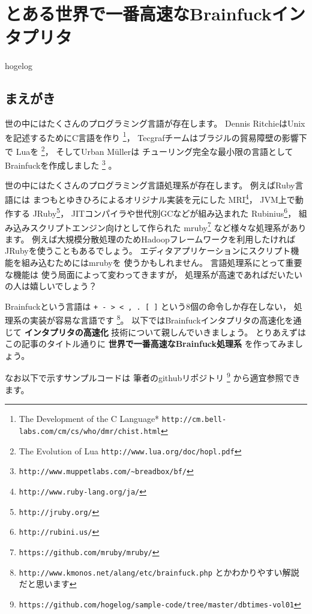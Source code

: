 

\chapter{とある世界で一番高速なBrainfuckインタプリタ}
\begin{flushright}
hogelog
\end{flushright}

\section{まえがき}
\lettrine{世}
の中にはたくさんのプログラミング言語が存在します。
Dennis RitchieはUnixを記述するためにC言語を作り
\footnote{The Development of the C Language* 
\verb|http://cm.bell-labs.com/cm/cs/who/dmr/chist.html|
}，
Tecgrafチームはブラジルの貿易障壁の影響下で
Luaを
\footnote{
The Evolution of Lua
\verb|http://www.lua.org/doc/hopl.pdf|
}，
そしてUrban M\"ullerは
チューリング完全な最小限の言語として
Brainfuckを作成しました
\footnote{
\verb|http://www.muppetlabs.com/~breadbox/bf/|
}
。

世の中にはたくさんのプログラミング言語処理系が存在します。
例えばRuby言語には
まつもとゆきひろによるオリジナル実装を元にした
MRI\footnote{
\verb|http://www.ruby-lang.org/ja/|
}，
JVM上で動作する
JRuby\footnote{
\verb|http://jruby.org/|
}，
JITコンパイラや世代別GCなどが組み込まれた
Rubinius\footnote{
\verb|http://rubini.us/|
}，
組み込みスクリプトエンジン向けとして作られた
mruby\footnote{
\verb|https://github.com/mruby/mruby/|
}
など様々な処理系があります。
例えば大規模分散処理のためHadoopフレームワークを利用したければ
JRubyを使うこともあるでしょう。
エディタアプリケーションにスクリプト機能を組み込むためにはmrubyを
使うかもしれません。
言語処理系にとって重要な機能は
使う局面によって変わってきますが，
処理系が高速であればだいたいの人は嬉しいでしょう？

Brainfuckという言語は
\verb|+ - > < , . [ ]|
という8個の命令しか存在しない，
処理系の実装が容易な言語です
\footnote{
\verb|http://www.kmonos.net/alang/etc/brainfuck.php|
とかわかりやすい解説だと思います
}。
以下ではBrainfuckインタプリタの高速化を通じて
\textbf{インタプリタの高速化}
技術について親しんでいきましょう。
とりあえずはこの記事のタイトル通りに
{\Large \textbf{世界で一番高速なBrainfuck処理系}}
を作ってみましょう。

なお以下で示すサンプルコードは
筆者のgithubリポジトリ
\footnote{\verb|https://github.com/hogelog/sample-code/tree/master/dbtimes-vol01|}
から適宜参照できます。

